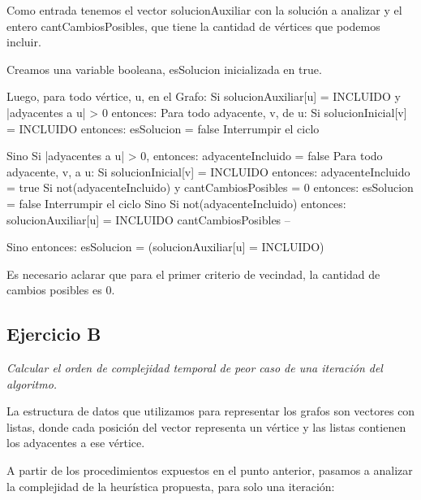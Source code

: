 \begin{codesnippet}
Como entrada tenemos el vector solucionAuxiliar con la solución a analizar y el entero
cantCambiosPosibles, que tiene la cantidad de vértices que podemos incluir.

Creamos una variable booleana, esSolucion inicializada en true.

Luego, para todo vértice, u, en el Grafo:
  Si solucionAuxiliar[u] = INCLUIDO y |adyacentes a u| > 0 entonces:
     Para todo adyacente, v, de u:
         Si solucionInicial[v] = INCLUIDO entonces:
             esSolucion = false
             Interrumpir el ciclo

  Sino Si |adyacentes a u| > 0, entonces:
       adyacenteIncluido = false
       Para todo adyacente, v, a u:
          Si solucionInicial[v] = INCLUIDO entonces:
             adyacenteIncluido = true
       Si not(adyacenteIncluido) y cantCambiosPosibles = 0 entonces:
         esSolucion = false
         Interrumpir el ciclo
       Sino Si not(adyacenteIncluido) entonces:
         solucionAuxiliar[u] = INCLUIDO
         cantCambiosPosibles --

  Sino entonces:
       esSolucion = (solucionAuxiliar[u] = INCLUIDO)
\end{codesnippet}

Es necesario aclarar que para el primer criterio de vecindad, la cantidad de cambios posibles es 0.

\subsection{Ejercicio B}

\textit{Calcular el orden de complejidad temporal de peor caso de una iteración del algoritmo.}
\medskip

La estructura de datos que utilizamos para representar los grafos son vectores con listas, donde cada posición del vector representa un vértice y las listas contienen los adyacentes a ese vértice.

A partir de los procedimientos expuestos en el punto anterior, pasamos a analizar la complejidad de la heurística propuesta, para solo una iteración:

